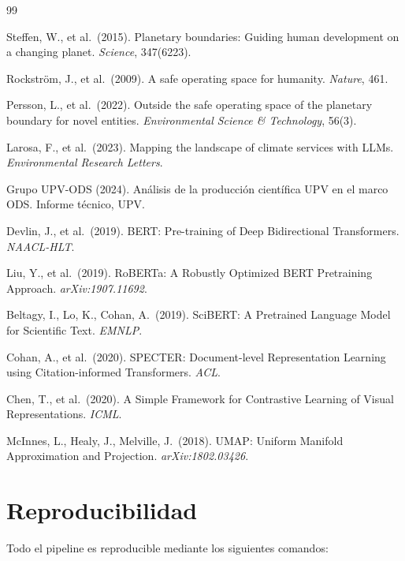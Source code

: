 \documentclass[11pt,a4paper]{article}
\begin{document}
\begin{thebibliography}{99}\small

 Steffen, W., et al.\ (2015). Planetary boundaries: Guiding human development on a changing planet. \emph{Science}, 347(6223).

 Rockström, J., et al.\ (2009). A safe operating space for humanity. \emph{Nature}, 461.

 Persson, L., et al.\ (2022). Outside the safe operating space of the planetary boundary for novel entities. \emph{Environmental Science \& Technology}, 56(3).

 Larosa, F., et al.\ (2023). Mapping the landscape of climate services with LLMs. \emph{Environmental Research Letters}.

 Grupo UPV-ODS (2024). Análisis de la producción científica UPV en el marco ODS. Informe técnico, UPV.

 Devlin, J., et al.\ (2019). BERT: Pre-training of Deep Bidirectional Transformers. \emph{NAACL-HLT}.

 Liu, Y., et al.\ (2019). RoBERTa: A Robustly Optimized BERT Pretraining Approach. \emph{arXiv:1907.11692}.

 Beltagy, I., Lo, K., Cohan, A.\ (2019). SciBERT: A Pretrained Language Model for Scientific Text. \emph{EMNLP}.

 Cohan, A., et al.\ (2020). SPECTER: Document-level Representation Learning using Citation-informed Transformers. \emph{ACL}.

 Chen, T., et al.\ (2020). A Simple Framework for Contrastive Learning of Visual Representations. \emph{ICML}.

 McInnes, L., Healy, J., Melville, J.\ (2018). UMAP: Uniform Manifold Approximation and Projection. \emph{arXiv:1802.03426}.

\end{thebibliography}

\appendix
\section{Reproducibilidad}

Todo el pipeline es reproducible mediante los siguientes comandos:
\end{document}
